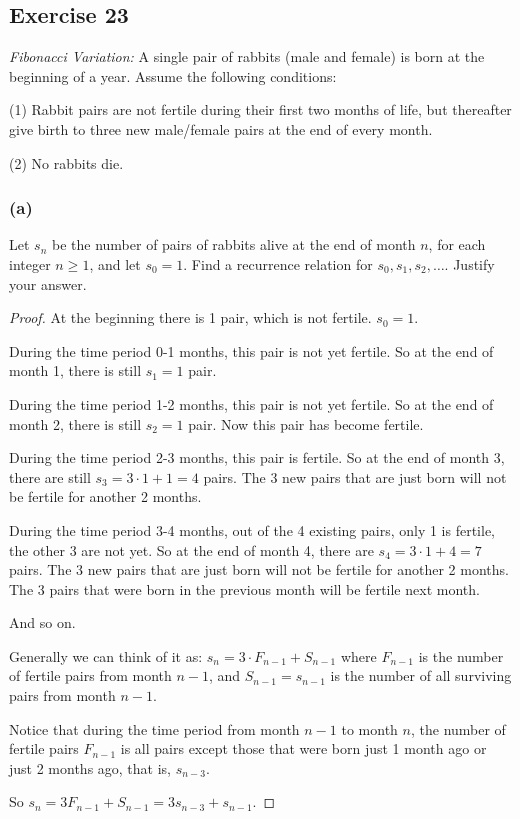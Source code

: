 \documentclass[14pt]{extarticle}
\begin{document}
\subsection{Exercise 23}
{\it Fibonacci Variation:} A single pair of rabbits (male and female) is born at the beginning of a year. 
Assume the following conditions:

(1) Rabbit pairs are not fertile during their first two months of life, but thereafter give birth to three new
male/female pairs at the end of every month.

(2) No rabbits die.

\subsubsection{(a)}
Let $s_n$ be the number of pairs of rabbits alive at the end of month $n$, for each integer $n \geq 1$, and let 
$s_0 = 1$. Find a recurrence relation for $s_0, s_1, s_2, \ldots$. Justify your answer.

\begin{proof}
At the beginning there is 1 pair, which is not fertile. $s_0 = 1$.

During the time period 0-1 months, this pair is not yet fertile. So at the end of month 1, there is still $s_1 = 1$
pair. 

During the time period 1-2 months, this pair is not yet fertile. So at the end of month 2, there is still $s_2 = 1$
pair. Now this pair has become fertile. 

During the time period 2-3 months, this pair is fertile. So at the end of month 3, there are still 
$s_3 = 3 \cdot 1 + 1 = 4$ pairs. The 3 new pairs that are just born will not be fertile for another 2 months.

During the time period 3-4 months, out of the 4 existing pairs, only 1 is fertile, the other 3 are not yet. So at 
the end of month 4, there are $s_4 = 3 \cdot 1 + 4 = 7$ pairs. The 3 new pairs that are just born will not be 
fertile for another 2 months. The 3 pairs that were born in the previous month will be fertile next month.

And so on.

Generally we can think of it as: $s_n = 3 \cdot F_{n-1} + S_{n-1}$ where $F_{n-1}$ is the number of fertile pairs 
from month $n-1$, and $S_{n-1} = s_{n-1}$ is the number of all surviving pairs from month $n-1$.

Notice that during the time period from month $n-1$ to month $n$, the number of fertile pairs $F_{n-1}$ is all 
pairs except those that were born just 1 month ago or just 2 months ago, that is, $s_{n-3}$.

So $s_n = 3F_{n-1} + S_{n-1} = 3s_{n-3} + s_{n-1}$.
\end{proof}
\end{document}
